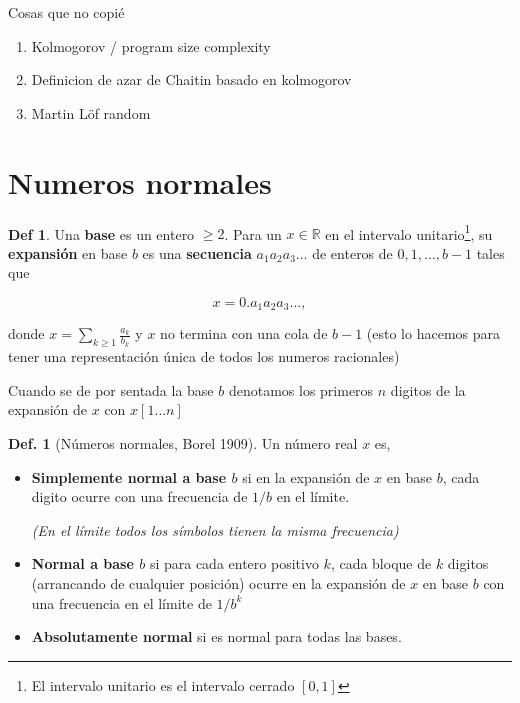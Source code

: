 \documentclass{report}
\theoremstyle{definition} %
\newtheorem{definition}{Def.}
\newtheorem*{definition*}{Def}
\begin{document}
Cosas que no copié

\begin{enumerate}
    \item Kolmogorov / program size complexity
    \item Definicion de azar de Chaitin basado en kolmogorov
    \item Martin Löf random
\end{enumerate}

\section{Numeros normales}

\begin{definition*}
    Una \textbf{base} es un entero $\geq 2$. Para un $x \in \mathbb{R}$ en el
    intervalo unitario\footnote{El intervalo unitario es el intervalo cerrado
    $[0, 1]$}, su \textbf{expansión} en base $b$ es una \textbf{secuencia} $a_1
    a_2 a_3 \dots$ de enteros de ${0, 1, \dots, b-1}$ tales que

    $$x = 0.a_1 a_2 a_3 \dots,$$

    donde $x = \sum_{k \geq 1} \frac{a_k}{b_k}$ y $x$ no termina con una cola de
    $b - 1$ (esto lo hacemos para tener una representación única de todos los
    numeros racionales)

    Cuando se de por sentada la base $b$ denotamos los primeros $n$ digitos de
    la expansión de $x$ con $x[1\dots n]$
\end{definition*}


\begin{definition}[Números normales, Borel 1909]
    Un número real $x$ es,
    \begin{itemize}
        \item \textbf{Simplemente normal a base $b$} si en la expansión de $x$
        en base $b$, cada digito ocurre con una frecuencia de $1/b$ en el
        límite.

        \textit{(En el límite todos los símbolos tienen la misma frecuencia)}
        \item \textbf{Normal a base $b$} si para cada entero positivo $k$, cada
        bloque de $k$ digitos (arrancando de cualquier posición) ocurre en la
        expansión de $x$ en base $b$ con una frecuencia en el límite de $1/b^k$
        \item \textbf{Absolutamente normal} si es normal para todas las bases.
    \end{itemize}
\end{definition}
\end{document}
